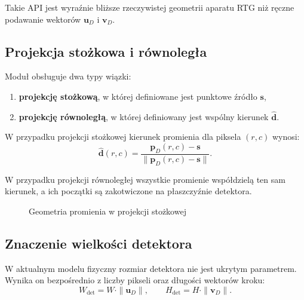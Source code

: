 \documentclass[12pt,a4paper]{article}
\begin{document}
Takie API jest wyraźnie bliższe rzeczywistej geometrii aparatu RTG niż ręczne
podawanie wektorów \(\mathbf{u}_D\) i \(\mathbf{v}_D\).

\subsection{Projekcja stożkowa i równoległa}

Moduł obsługuje dwa typy wiązki:
\begin{enumerate}[label=\alph*)]
  \item \textbf{projekcję stożkową}, w której definiowane jest punktowe źródło
        \(\mathbf{s}\),
  \item \textbf{projekcję równoległą}, w której definiowany jest wspólny kierunek
        \(\hat{\mathbf{d}}\).
\end{enumerate}

W przypadku projekcji stożkowej kierunek promienia dla piksela \((r,c)\) wynosi:
\[
  \hat{\mathbf{d}}(r,c) =
  \frac{\mathbf{p}_D(r,c) - \mathbf{s}}
       {\|\mathbf{p}_D(r,c) - \mathbf{s}\|}.
\]

W przypadku projekcji równoległej wszystkie promienie współdzielą ten sam kierunek,
a ich początki są zakotwiczone na płaszczyźnie detektora.

\begin{figure}[H]
\centering
{}
\caption{Geometria promienia w projekcji stożkowej}
\end{figure}

\subsection{Znaczenie wielkości detektora}

W aktualnym modelu fizyczny rozmiar detektora nie jest ukrytym parametrem.
Wynika on bezpośrednio z liczby pikseli oraz długości wektorów kroku:
\[
  W_{\mathrm{det}} = W \cdot \|\mathbf{u}_D\|,
  \qquad
  H_{\mathrm{det}} = H \cdot \|\mathbf{v}_D\|.
\]
\end{document}
